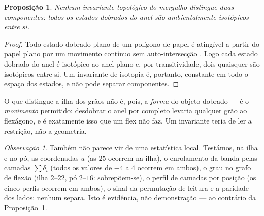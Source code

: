 \documentclass[11pt,a4paper]{article}
\theoremstyle{plain}
\newtheorem{proposicao}[teorema]{Proposição}
\theoremstyle{definition}
\theoremstyle{remark}
\newtheorem{observacao}[teorema]{Observação}
\begin{document}
\begin{proposicao}\label{prop:naotopologico}
Nenhum invariante topológico do mergulho distingue duas componentes: todos os
estados dobrados do anel são ambientalmente isotópicos entre si.
\end{proposicao}

\begin{proof}
Todo estado dobrado plano de um polígono de papel é atingível a partir do papel
plano por um movimento contínuo sem auto-intersecção \cite{cfp}. Logo cada
estado dobrado do anel é isotópico ao anel plano e, por transitividade, dois
quaisquer são isotópicos entre si. Um invariante de isotopia é, portanto,
constante em todo o espaço dos estados, e não pode separar componentes.
\end{proof}

O que distingue a ilha dos grãos não é, pois, a \emph{forma} do objeto
dobrado --- é o \emph{movimento} permitido: desdobrar o anel por completo
levaria qualquer grão ao flexágono, e é exatamente isso que um flex não faz.
Um invariante teria de ler a restrição, não a geometria.

\begin{observacao}
Também não parece vir de uma estatística local. Testámos, na ilha e no pó, as
coordenadas $u$ (as $25$ ocorrem na ilha), o enrolamento da banda pelas camadas
$\sum\delta_i$ (todos os valores de $-4$ a $4$ ocorrem em ambos), o grau no
grafo de flexão (ilha $2$--$22$, pó $2$--$16$: sobrepõem-se), o perfil de
camadas por posição (os cinco perfis ocorrem em ambos), o sinal da permutação
de leitura e a paridade dos lados: nenhum separa. Isto é evidência, não
demonstração --- ao contrário da Proposição~\ref{prop:naotopologico}.
\end{observacao}
\end{document}
